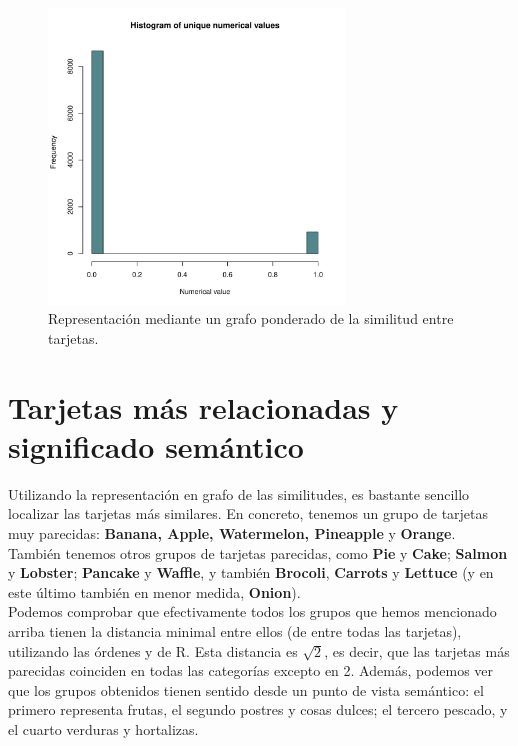 \documentclass[11pt,a4paper]{article}
\begin{document}
\begin{figure}[h!]
  \centering
  \includegraphics[page=3, width=0.7\textwidth]{Rplots.pdf}
  \caption{Representación mediante un grafo ponderado de la similitud entre tarjetas.}
  \label{fig:3}
\end{figure}

\section{Tarjetas más relacionadas y significado semántico}

Utilizando la representación en grafo de las similitudes, es bastante sencillo localizar las tarjetas más similares. En concreto, tenemos un grupo de tarjetas muy parecidas: \textbf{Banana, Apple, Watermelon, Pineapple} y \textbf{Orange}. También tenemos otros grupos de tarjetas parecidas, como \textbf{Pie} y \textbf{Cake}; \textbf{Salmon} y \textbf{Lobster}; \textbf{Pancake} y \textbf{Waffle}, y también \textbf{Brocoli}, \textbf{Carrots} y \textbf{Lettuce} (y en este último también en menor medida, \textbf{Onion}).\\

Podemos comprobar que efectivamente todos los grupos que hemos mencionado arriba tienen la distancia minimal entre ellos (de entre todas las tarjetas), utilizando las órdenes \verb@min@ y \verb@which@ de R. Esta distancia es $\sqrt{2}$, es decir, que las tarjetas más parecidas coinciden en todas las categorías excepto en 2. Además, podemos ver que los grupos obtenidos tienen sentido desde un punto de vista semántico: el primero representa frutas, el segundo postres y cosas dulces; el tercero pescado, y el cuarto verduras y hortalizas.\\
\end{document}
